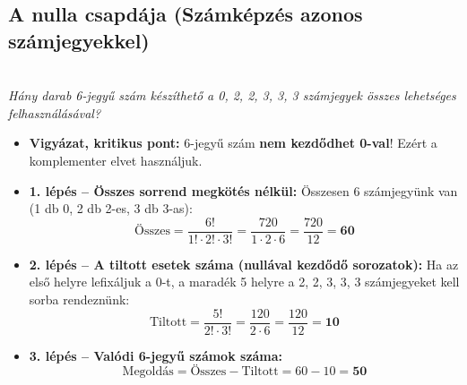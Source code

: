 \documentclass[11pt, a4paper]{article}
\begin{document}
    \vspace{0.5cm}

\subsection{A nulla csapdája (Számképzés azonos számjegyekkel)}\\
    \textit{Hány darab 6-jegyű szám készíthető a 0, 2, 2, 3, 3, 3 számjegyek összes lehetséges felhasználásával?}
    \begin{itemize}
        \item \textbf{Vigyázat, kritikus pont:} 6-jegyű szám \textbf{nem kezdődhet 0-val}! Ezért a komplementer elvet használjuk.
        \item \textbf{1. lépés – Összes sorrend megkötés nélkül:}
        Összesen 6 számjegyünk van (1 db 0, 2 db 2-es, 3 db 3-as):
        \[
        \text{Összes} = \frac{6!}{1! \cdot 2! \cdot 3!} = \frac{720}{1 \cdot 2 \cdot 6} = \frac{720}{12} = \mathbf{60}
        \]
        \item \textbf{2. lépés – A tiltott esetek száma (nullával kezdődő sorozatok):}
        Ha az első helyre lefixáljuk a 0-t, a maradék 5 helyre a 2, 2, 3, 3, 3 számjegyeket kell sorba rendeznünk:
        \[
        \text{Tiltott} = \frac{5!}{2! \cdot 3!} = \frac{120}{2 \cdot 6} = \frac{120}{12} = \mathbf{10}
        \]
        \item \textbf{3. lépés – Valódi 6-jegyű számok száma:}
        \[
        \text{Megoldás} = \text{Összes} - \text{Tiltott} = 60 - 10 = \mathbf{50}
        \]
    \end{itemize}

    \begin{center}
    \end{center}
\end{document}
